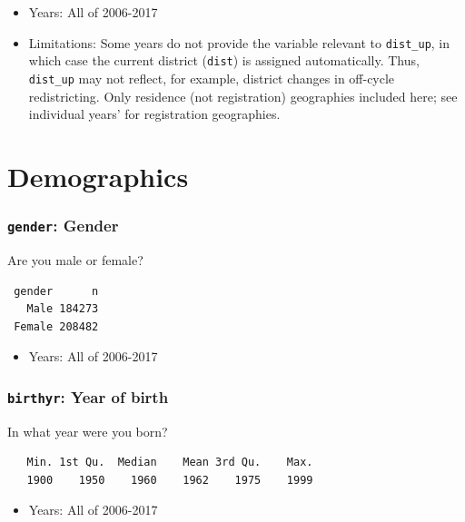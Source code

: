\documentclass[10pt,article,oneside]{memoir}
\theoremstyle{definition}
\begin{document}
\begin{itemize}
\tightlist
\item
  Years: All of 2006-2017
\item
  Limitations: Some years do not provide the variable relevant to
  \texttt{dist\_up}, in which case the current district (\texttt{dist})
  is assigned automatically. Thus, \texttt{dist\_up} may not reflect,
  for example, district changes in off-cycle redistricting. Only
  residence (not registration) geographies included here; see individual
  years' for registration geographies.
\end{itemize}

\hypertarget{demographics}{%
\section{Demographics}\label{demographics}}

\hypertarget{gender-gender}{%
\subsubsection{\texorpdfstring{\texttt{gender}:
Gender}{gender: Gender}}\label{gender-gender}}

Are you male or female?

\begin{verbatim}
 gender      n
   Male 184273
 Female 208482
\end{verbatim}

\begin{itemize}
\tightlist
\item
  Years: All of 2006-2017
\end{itemize}

\hypertarget{birthyr-year-of-birth}{%
\subsubsection{\texorpdfstring{\texttt{birthyr}: Year of
birth}{birthyr: Year of birth}}\label{birthyr-year-of-birth}}

In what year were you born?

\begin{verbatim}
   Min. 1st Qu.  Median    Mean 3rd Qu.    Max. 
   1900    1950    1960    1962    1975    1999 
\end{verbatim}

\begin{itemize}
\tightlist
\item
  Years: All of 2006-2017
\end{itemize}
\end{document}
